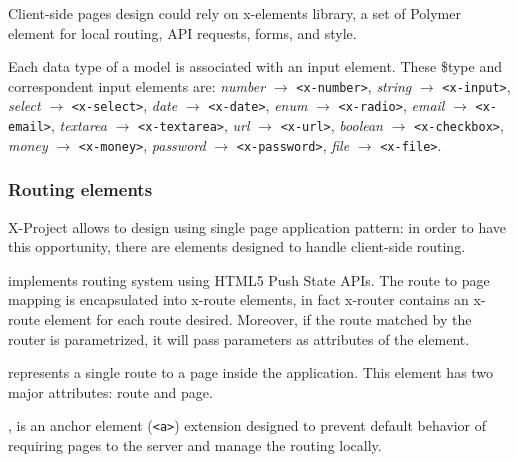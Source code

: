 \documentclass{sig-alternate}
\begin{document}


Client-side pages design could rely on x-elements library, a set of Polymer element for local routing, API requests, forms, and style. 


Each data type of a model is associated with an input element.
These \$type and correspondent input elements are: \emph{number} $\rightarrow$ \texttt{<x-number>}, \emph{string} $\rightarrow$ \texttt{<x-input>}, \emph{select} $\rightarrow$ \texttt{<x-select>}, \emph{date} $\rightarrow$ \texttt{<x-date>}, \emph{enum} $\rightarrow$ \texttt{<x-radio>}, \emph{email} $\rightarrow$ \texttt{<x-email>}, \emph{textarea} $\rightarrow$ \texttt{<x-textarea>}, \emph{url} $\rightarrow$ \texttt{<x-url>}, \emph{boolean} $\rightarrow$ \texttt{<x-checkbox>}, \emph{money} $\rightarrow$ \texttt{<x-money>}, \emph{password} $\rightarrow$ \texttt{<x-password>}, \emph{file} $\rightarrow$ \texttt{<x-file>}.



















\subsubsection{Routing elements}
X-Project allows to design using single page application pattern: in order to have this opportunity, there are elements designed to handle client-side routing.


\begin{description}
\itemsep1pt\parskip0pt
        \item[x-router] implements routing system using HTML5 Push State APIs. The route to page mapping is encapsulated into x-route elements, in fact x-router contains an x-route element for each route desired. Moreover, if the route matched by the router is parametrized, it will pass parameters as attributes of the element.
        \item[x-route] represents a single route to a page inside the application. This element has two major attributes: route and page. 
\item[x-link], is an anchor element ({\tt <a>}) extension designed to prevent default behavior of requiring pages to the server and manage the routing locally. \end{description}
\end{document}
